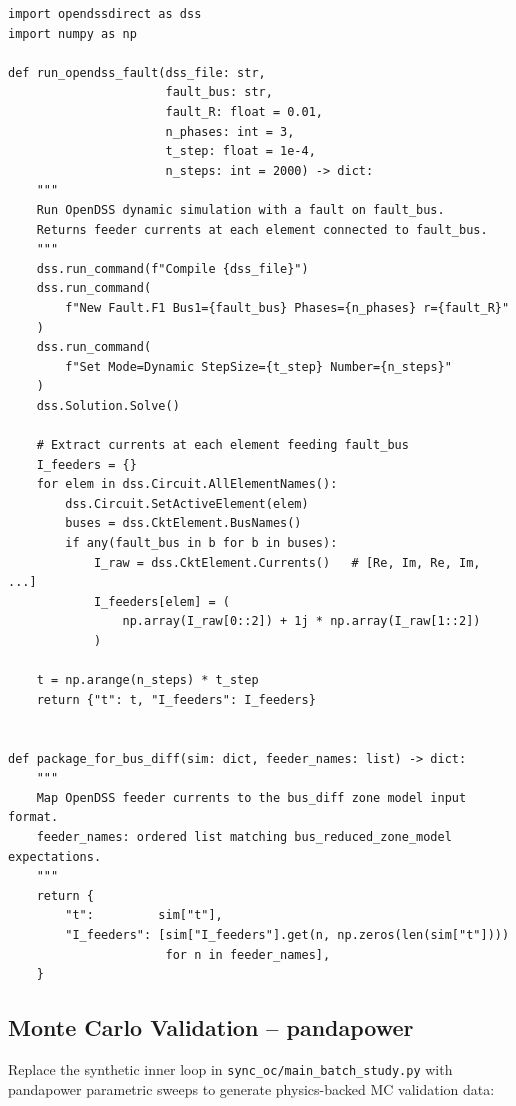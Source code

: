 \documentclass[11pt,a4paper]{article}
\begin{document}
\begin{lstlisting}[style=python, caption={04\_code/sambp/io\_utils/opendss\_adapter.py}]
import opendssdirect as dss
import numpy as np

def run_opendss_fault(dss_file: str,
                      fault_bus: str,
                      fault_R: float = 0.01,
                      n_phases: int = 3,
                      t_step: float = 1e-4,
                      n_steps: int = 2000) -> dict:
    """
    Run OpenDSS dynamic simulation with a fault on fault_bus.
    Returns feeder currents at each element connected to fault_bus.
    """
    dss.run_command(f"Compile {dss_file}")
    dss.run_command(
        f"New Fault.F1 Bus1={fault_bus} Phases={n_phases} r={fault_R}"
    )
    dss.run_command(
        f"Set Mode=Dynamic StepSize={t_step} Number={n_steps}"
    )
    dss.Solution.Solve()

    # Extract currents at each element feeding fault_bus
    I_feeders = {}
    for elem in dss.Circuit.AllElementNames():
        dss.Circuit.SetActiveElement(elem)
        buses = dss.CktElement.BusNames()
        if any(fault_bus in b for b in buses):
            I_raw = dss.CktElement.Currents()   # [Re, Im, Re, Im, ...]
            I_feeders[elem] = (
                np.array(I_raw[0::2]) + 1j * np.array(I_raw[1::2])
            )

    t = np.arange(n_steps) * t_step
    return {"t": t, "I_feeders": I_feeders}


def package_for_bus_diff(sim: dict, feeder_names: list) -> dict:
    """
    Map OpenDSS feeder currents to the bus_diff zone model input format.
    feeder_names: ordered list matching bus_reduced_zone_model expectations.
    """
    return {
        "t":         sim["t"],
        "I_feeders": [sim["I_feeders"].get(n, np.zeros(len(sim["t"])))
                      for n in feeder_names],
    }
\end{lstlisting}

\subsection{Monte Carlo Validation -- pandapower}

Replace the synthetic inner loop in \texttt{sync\_oc/main\_batch\_study.py}
with pandapower parametric sweeps to generate
physics-backed MC validation data:
\end{document}

